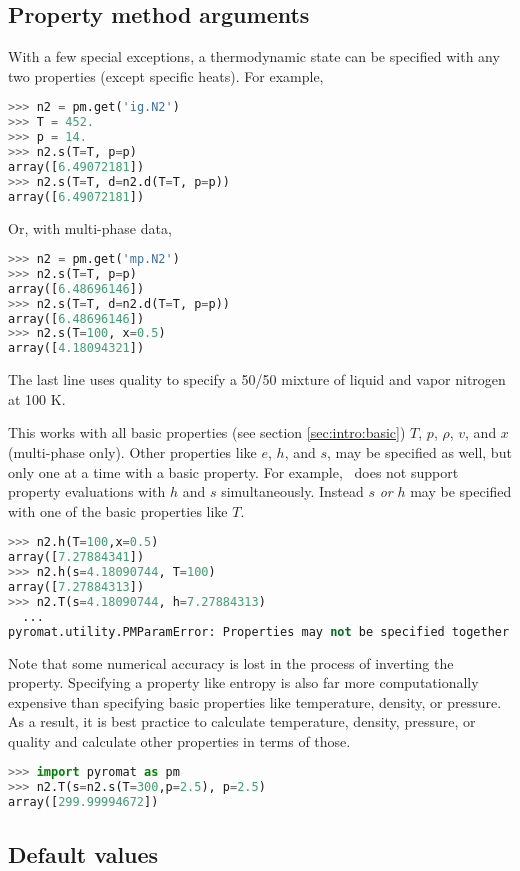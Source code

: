 \subsection{Property method arguments}

With a few special exceptions, a thermodynamic state can be specified with any two properties (except specific heats).  For example,
\begin{lstlisting}[language=Python]
>>> n2 = pm.get('ig.N2')
>>> T = 452.
>>> p = 14.
>>> n2.s(T=T, p=p)
array([6.49072181])
>>> n2.s(T=T, d=n2.d(T=T, p=p))
array([6.49072181])
\end{lstlisting}
Or, with multi-phase data,
\begin{lstlisting}[language=Python]
>>> n2 = pm.get('mp.N2')
>>> n2.s(T=T, p=p)
array([6.48696146])
>>> n2.s(T=T, d=n2.d(T=T, p=p))
array([6.48696146])
>>> n2.s(T=100, x=0.5)
array([4.18094321])
\end{lstlisting}
The last line uses quality to specify a 50/50 mixture of liquid and vapor nitrogen at 100 K.

This works with all basic properties (see section \ref{sec:intro:basic}) $T$, $p$, $\rho$, $v$, and $x$ (multi-phase only).  Other properties like $e$, $h$, and $s$, may be specified as well, but only one at a time with a basic property.  For example, \PM\ does not support property evaluations with $h$ and $s$ simultaneously.  Instead $s$ \emph{or} $h$ may be specified with one of the basic properties like $T$.
\begin{lstlisting}[language=Python]
>>> n2.h(T=100,x=0.5)
array([7.27884341])
>>> n2.h(s=4.18090744, T=100)
array([7.27884313])
>>> n2.T(s=4.18090744, h=7.27884313)
  ...
pyromat.utility.PMParamError: Properties may not be specified together: s, h
\end{lstlisting}

Note that some numerical accuracy is lost in the process of inverting the property.  Specifying a property like entropy is also far more computationally expensive than specifying basic properties like temperature, density, or pressure.  As a result, it is best practice to calculate temperature, density, pressure, or quality and calculate other properties in terms of those.
\begin{lstlisting}[language=Python]
>>> import pyromat as pm
>>> n2.T(s=n2.s(T=300,p=2.5), p=2.5)
array([299.99994672])
\end{lstlisting}

\subsection{Default values}

